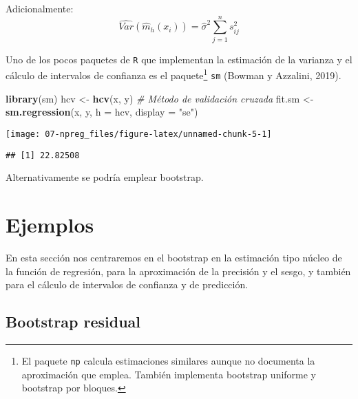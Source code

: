 \documentclass[
]{book}
\newenvironment{Shaded}{\begin{snugshade}}{\end{snugshade}}
\newcommand{\CommentTok}[1]{\textcolor[rgb]{0.56,0.35,0.01}{\textit{#1}}}
\newcommand{\DataTypeTok}[1]{\textcolor[rgb]{0.13,0.29,0.53}{#1}}
\newcommand{\KeywordTok}[1]{\textcolor[rgb]{0.13,0.29,0.53}{\textbf{#1}}}
\newcommand{\NormalTok}[1]{#1}
\newcommand{\OperatorTok}[1]{\textcolor[rgb]{0.81,0.36,0.00}{\textbf{#1}}}
\newcommand{\StringTok}[1]{\textcolor[rgb]{0.31,0.60,0.02}{#1}}
\theoremstyle{break}
\theoremstyle{definition}
\theoremstyle{definition}
\theoremstyle{definition}
\theoremstyle{remark}
\begin{document}
Adicionalmente:
\[\widehat{Var}\left(\hat{m}_{h}(x_i)\right) = \hat\sigma^2\sum_{j=1}^n s^2_{ij}\]

Uno de los pocos paquetes de \texttt{R} que implementan la estimación de la varianza
y el cálculo de intervalos de confianza es el paquete\footnote{El paquete \texttt{np} calcula
  estimaciones similares aunque no documenta la aproximación que emplea. También
  implementa bootstrap uniforme y bootstrap por bloques.} \texttt{sm} (Bowman y Azzalini, 2019).

\begin{Shaded}
\begin{Highlighting}[]
\KeywordTok{library}\NormalTok{(sm)}
\NormalTok{hcv <-}\StringTok{ }\KeywordTok{hcv}\NormalTok{(x, y) }\CommentTok{# Método de validación cruzada}
\NormalTok{fit.sm <-}\StringTok{ }\KeywordTok{sm.regression}\NormalTok{(x, y, }\DataTypeTok{h =}\NormalTok{ hcv, }\DataTypeTok{display =} \StringTok{"se"}\NormalTok{)}
\end{Highlighting}
\end{Shaded}

\begin{center}\texttt{[image: 07-npreg\_files/figure-latex/unnamed-chunk-5-1]} \end{center}

\begin{Shaded}
\end{Shaded}

\begin{verbatim}
## [1] 22.82508
\end{verbatim}

Alternativamente se podría emplear bootstrap.

\hypertarget{ejemplos-2}{%
\section{Ejemplos}\label{ejemplos-2}}

En esta sección nos centraremos en el bootstrap en la estimación tipo núcleo de la función de regresión, para la aproximación de la precisión y el sesgo, y también para el cálculo de intervalos de confianza y de predicción.

\hypertarget{bootstrap-residual}{%
\subsection{Bootstrap residual}\label{bootstrap-residual}}
\end{document}
